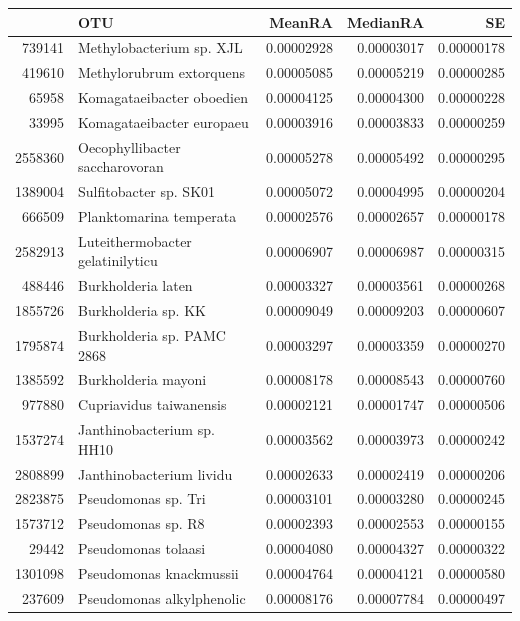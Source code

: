 \begin{table}[ht]
\centering
\begin{tabular}{rlrrr}
  \hline
 & OTU & MeanRA & MedianRA & SE \\ 
  \hline
739141 & Methylobacterium sp. XJL & 0.00002928 & 0.00003017 & 0.00000178 \\ 
  419610 & Methylorubrum extorquens & 0.00005085 & 0.00005219 & 0.00000285 \\ 
  65958 & Komagataeibacter oboedien & 0.00004125 & 0.00004300 & 0.00000228 \\ 
  33995 & Komagataeibacter europaeu & 0.00003916 & 0.00003833 & 0.00000259 \\ 
  2558360 & Oecophyllibacter saccharovoran & 0.00005278 & 0.00005492 & 0.00000295 \\ 
  1389004 & Sulfitobacter sp. SK01 & 0.00005072 & 0.00004995 & 0.00000204 \\ 
  666509 & Planktomarina temperata & 0.00002576 & 0.00002657 & 0.00000178 \\ 
  2582913 & Luteithermobacter gelatinilyticu & 0.00006907 & 0.00006987 & 0.00000315 \\ 
  488446 & Burkholderia laten & 0.00003327 & 0.00003561 & 0.00000268 \\ 
  1855726 & Burkholderia sp. KK & 0.00009049 & 0.00009203 & 0.00000607 \\ 
  1795874 & Burkholderia sp. PAMC 2868 & 0.00003297 & 0.00003359 & 0.00000270 \\ 
  1385592 & Burkholderia mayoni & 0.00008178 & 0.00008543 & 0.00000760 \\ 
  977880 & Cupriavidus taiwanensis & 0.00002121 & 0.00001747 & 0.00000506 \\ 
  1537274 & Janthinobacterium sp. HH10 & 0.00003562 & 0.00003973 & 0.00000242 \\ 
  2808899 & Janthinobacterium lividu & 0.00002633 & 0.00002419 & 0.00000206 \\ 
  2823875 & Pseudomonas sp. Tri & 0.00003101 & 0.00003280 & 0.00000245 \\ 
  1573712 & Pseudomonas sp. R8 & 0.00002393 & 0.00002553 & 0.00000155 \\ 
  29442 & Pseudomonas tolaasi & 0.00004080 & 0.00004327 & 0.00000322 \\ 
  1301098 & Pseudomonas knackmussii & 0.00004764 & 0.00004121 & 0.00000580 \\ 
  237609 & Pseudomonas alkylphenolic & 0.00008176 & 0.00007784 & 0.00000497 \\ 

\end{tabular}
\end{table}
